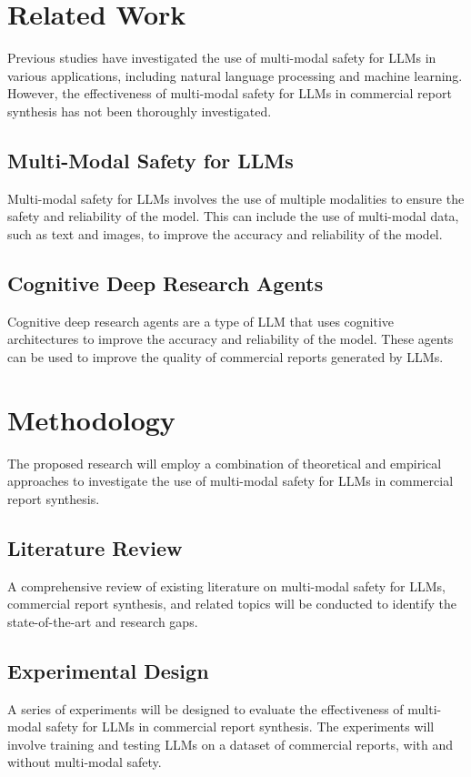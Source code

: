 \documentclass{article}
\begin{document}
\section{Related Work}
Previous studies have investigated the use of multi-modal safety for LLMs in various applications, including natural language processing and machine learning. However, the effectiveness of multi-modal safety for LLMs in commercial report synthesis has not been thoroughly investigated.

\subsection{Multi-Modal Safety for LLMs}
Multi-modal safety for LLMs involves the use of multiple modalities to ensure the safety and reliability of the model. This can include the use of multi-modal data, such as text and images, to improve the accuracy and reliability of the model.

\subsection{Cognitive Deep Research Agents}
Cognitive deep research agents are a type of LLM that uses cognitive architectures to improve the accuracy and reliability of the model. These agents can be used to improve the quality of commercial reports generated by LLMs.

\section{Methodology}
The proposed research will employ a combination of theoretical and empirical approaches to investigate the use of multi-modal safety for LLMs in commercial report synthesis.

\subsection{Literature Review}
A comprehensive review of existing literature on multi-modal safety for LLMs, commercial report synthesis, and related topics will be conducted to identify the state-of-the-art and research gaps.

\subsection{Experimental Design}
A series of experiments will be designed to evaluate the effectiveness of multi-modal safety for LLMs in commercial report synthesis. The experiments will involve training and testing LLMs on a dataset of commercial reports, with and without multi-modal safety.
\end{document}
